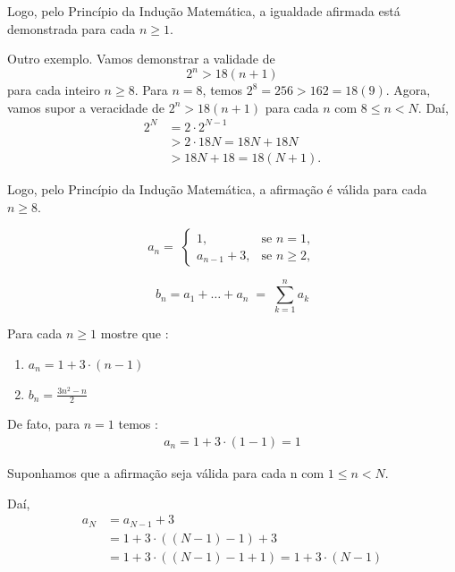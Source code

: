 Logo, pelo Princípio da Indução Matemática, a igualdade afirmada está demonstrada
para cada $n \geq 1$.

Outro exemplo. Vamos demonstrar a validade de
\[
2^{n} > 18(n+1)
\]
para cada inteiro $n \geq 8$. Para $n = 8$, temos $2^{8} = 256 > 162 = 18(9)$. Agora, vamos supor a veracidade de
$2^{n} > 18(n+1)$ para cada $n$ com $8 \leq n < N$. Daí,
\begin{align*}
    2^{N} 
    &= 2 \cdot 2^{N-1} \\[4pt]
    &> 2 \cdot 18N = 18N + 18N \\[4pt]
    &> 18N + 18 = 18(N+1).
\end{align*}

Logo, pelo Princípio da Indução Matemática, a afirmação é válida para cada $n \geq 8$.

\begin{exemplo}[Sequências]
    \begin{equation*}
        a_n =\; \begin{cases}
            1, & \text{se } n = 1,\\
            a_{n-1}+3, & \text{se } n \ge 2,
        \end{cases}
    \end{equation*}

    \begin{equation*}
        b_n = a_1 + \dotsc + a_n \;=\; \sum_{k=1}^{n} a_k
    \end{equation*}

    Para cada $n \ge 1$ mostre que :
    \begin{enumerate}[label=\roman*., left=0.5cm, align=left, nosep]
        \item $a_{n} = 1 + 3 \cdot (n-1)$
        \item $b_{n} = \frac{3n^{2} - n}{2}$
    \end{enumerate}
    
\end{exemplo}

De fato, para $n = 1$ temos :
\begin{align*}
    a_n = 1 + 3 \cdot (1 - 1) = 1
\end{align*}

Suponhamos que a afirmação seja válida para cada n com $1 \leq n < N$. 

Daí,
\begin{align*}
    a_{N} &= a_{N-1} + 3 \\
    &= 1 + 3 \cdot ((N-1) - 1) + 3 \\
    &= 1 + 3 \cdot ((N-1) - 1 + 1) = 1 + 3 \cdot (N - 1) 
\end{align*}


